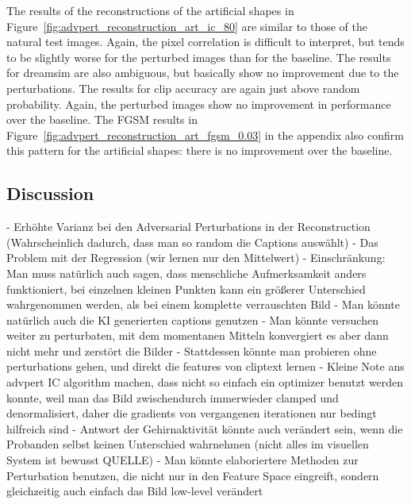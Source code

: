 The results of the reconstructions of the artificial shapes in Figure~\ref{fig:advpert_reconstruction_art_ic_80} are similar to those of the natural test images. Again, the pixel correlation is difficult to interpret, but tends to be slightly worse for the perturbed images than for the baseline. The results for dreamsim are also ambiguous, but basically show no improvement due to the perturbations. The results for clip accuracy are again just above random probability. Again, the perturbed images show no improvement in performance over the baseline. The FGSM results in Figure~\ref{fig:advpert_reconstruction_art_fgsm_0.03} in the appendix also confirm this pattern for the artificial shapes: there is no improvement over the baseline. 


\subsection{Discussion}

- Erhöhte Varianz bei den Adversarial Perturbations in der Reconstruction (Wahrscheinlich dadurch, dass man so random die Captions auswählt)
- Das Problem mit der Regression (wir lernen nur den Mittelwert)
- Einschränkung: Man muss natürlich auch sagen, dass menschliche Aufmerksamkeit anders funktioniert, bei einzelnen kleinen Punkten kann ein größerer Unterschied wahrgenommen werden, als bei einem komplette verrauschten Bild
- Man könnte natürlich auch die KI generierten captions genutzen
- Man könnte versuchen weiter zu perturbaten, mit dem momentanen Mitteln konvergiert es aber dann nicht mehr und zerstört die Bilder
- Stattdessen könnte man probieren ohne perturbations gehen, und direkt die features von cliptext lernen
- Kleine Note ans advpert IC algorithm machen, dass nicht so einfach ein optimizer benutzt werden konnte, weil man das Bild zwischendurch immerwieder clamped und denormalisiert, daher die gradients von vergangenen iterationen nur bedingt hilfreich sind
- Antwort der Gehirnaktivität könnte auch verändert sein, wenn die Probanden selbst keinen Unterschied wahrnehmen (nicht alles im visuellen System ist bewusst QUELLE)
- Man könnte elaboriertere Methoden zur Perturbation benutzen, die nicht nur in den Feature Space eingreift, sondern gleichzeitig auch einfach das Bild low-level verändert \cite{zhaoNovelCrossPerturbationSingle2024}
